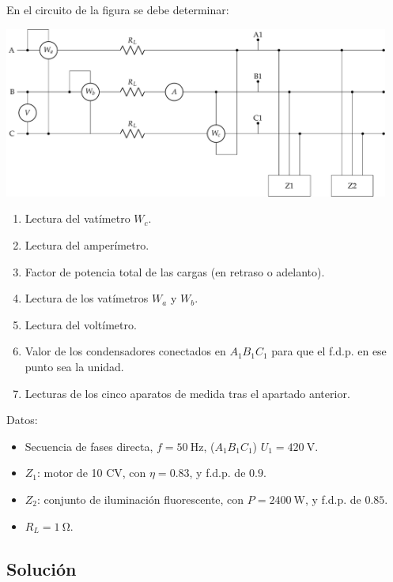 En el circuito de la figura se debe determinar:

\begin{center}
  \includegraphics[width=0.95\textwidth]{figuras/BT3_11.pdf}
\end{center}

\begin{enumerate}
\item Lectura del vatímetro $W_c$.
\item Lectura del amperímetro.
\item Factor de potencia total de las cargas (en retraso o
  adelanto).
\item Lectura de los vatímetros $W_a$ y $W_b$.
\item Lectura del voltímetro.
\item Valor de los condensadores conectados en $A_1B_1C_1$ para
  que el f.d.p. en ese punto sea la unidad.
\item Lecturas de los cinco aparatos de medida tras el apartado
  anterior.
\end{enumerate}

Datos:
\begin{itemize}
\item Secuencia de fases directa, $f = \SI{50}{\hertz}$, ($A_1B_1C_1$)
  $U_1 = \SI{420}{\volt}$.
\item $Z_1$: motor de 10 CV, con $\eta = 0.83$, y f.d.p. de $0.9$.
\item $Z_2$: conjunto de iluminación fluorescente, con
  $P = \SI{2400}{\watt}$, y f.d.p. de $0.85$.
\item $R_L = \SI{1}{\ohm}$.
\end{itemize}

\subsection*{Solución}

